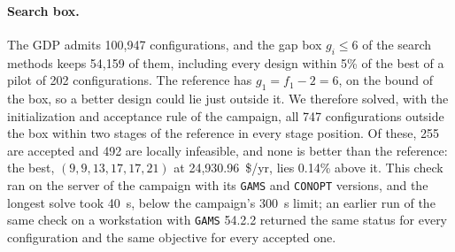 \paragraph{Search box.}
The GDP admits 100,947 configurations, and the gap box \(g_i\le6\) of the search methods keeps 54,159 of them, including every design within 5\% of the best of a pilot of 202 configurations.
The reference has \(g_1=f_1-2=6\), on the bound of the box, so a better design could lie just outside it.
We therefore solved, with the initialization and acceptance rule of the campaign, all 747 configurations outside the box within two stages of the reference in every stage position.
Of these, 255 are accepted and 492 are locally infeasible, and none is better than the reference: the best, \((9,9,13,17,17,21)\) at 24,930.96~\$/yr, lies 0.14\% above it.
This check ran on the server of the campaign with its \texttt{GAMS} and \texttt{CONOPT} versions, and the longest solve took 40~s, below the campaign's 300~s limit; an earlier run of the same check on a workstation with \texttt{GAMS} 54.2.2 returned the same status for every configuration and the same objective for every accepted one.

